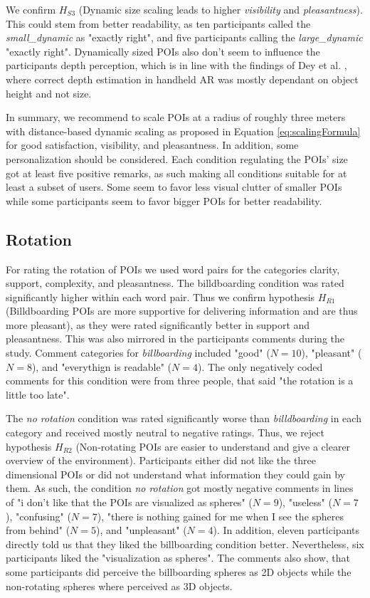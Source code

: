We confirm $H_{S3}$ (Dynamic size scaling leads to higher \textit{visibility} and \textit{pleasantness}). This could stem from better readability, as ten participants called the \textit{small\_dynamic} as "exactly right", and five participants calling the \textit{large\_dynamic} "exactly right". Dynamically sized POIs also don't seem to influence the participants depth perception, which is in line with the findings of Dey et al. \cite{dey2012tablet}, where correct depth estimation in handheld AR was mostly dependant on object height and not size.

In summary, we recommend to scale POIs at a radius of roughly three meters with distance-based dynamic scaling as proposed in Equation \ref{eq:scalingFormula} for good satisfaction, visibility, and pleasantness. In addition, some personalization should be considered. Each condition regulating the POIs' size got at least five positive remarks, as such making all conditions suitable for at least a subset of users. Some seem to favor less visual clutter of smaller POIs while some participants seem to favor bigger POIs for better readability.



\subsection{Rotation}
For rating the rotation of POIs we used word pairs for the categories clarity, support, complexity, and pleasantness. The billdboarding condition was rated significantly higher within each word pair. Thus we confirm hypothesis $H_{R1}$ (Billdboarding POIs are more supportive for delivering
information and are thus more pleasant), as they were rated significantly better in support and pleasantness. This was also mirrored in the participants comments during the study. Comment categories for \textit{billboarding} included "good" ($N=10$), "pleasant" ($N=8$), and "everythign is readable" ($N=4$). The only negatively coded comments for this condition were from three people, that said "the rotation is a little too late".

The \textit{no rotation} condition was rated significantly worse than \textit{billdboarding} in each category and received mostly neutral to negative ratings. Thus, we reject hypothesis $H_{R2}$ (Non-rotating POIs are easier to understand and give a clearer overview of the environment). Participants either did not like the three dimensional POIs or did not understand what information they could gain by them. As such, the condition \textit{no rotation} got mostly negative comments in lines of "i don't like that the POIs are visualized as spheres" ($N=9$), "useless" ($N=7$), "confusing" ($N=7$), "there is nothing gained for me when I see the spheres from behind" ($N=5$), and "unpleasant" ($N=4$). In addition, eleven participants directly told us that they liked the billboarding condition better. Nevertheless, six participants liked the "visualization as spheres". The comments also show, that some participants did perceive the billboarding spheres as 2D objects while the non-rotating spheres where perceived as 3D objects.

